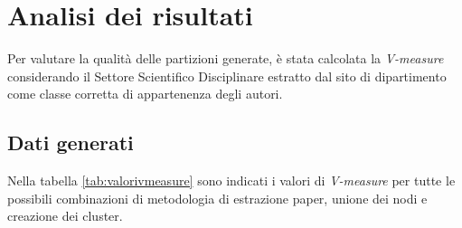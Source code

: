 \documentclass[12pt,a4paper,twoside]{report}
\begin{document}
\section{Analisi dei risultati} \label{sec:risultati}

Per valutare la qualità delle partizioni generate, è stata calcolata la \textit{V-measure}
considerando il Settore Scientifico Disciplinare estratto dal sito di dipartimento come classe
corretta di appartenenza degli autori.

\subsection{Dati generati}

Nella tabella \ref{tab:valorivmeasure} sono indicati i valori di \textit{V-measure} per tutte le
possibili combinazioni di metodologia di estrazione paper, unione dei nodi e creazione dei cluster.
\end{document}
